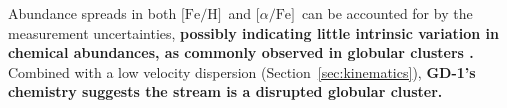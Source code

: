 \documentclass[twocolumn]{aastex63}
\newcommand{\gaia}{\textsl{Gaia}}
\newcommand{\pans}{\textsl{Pan-STARRS}}
\newcommand{\masyr}{\ensuremath{\textrm{mas}\,\textrm{yr}^{-1}}}
\newcommand{\feh}{\ensuremath{\textrm{[Fe/H]}}}
\newcommand{\afe}{\ensuremath{\textrm{[$\alpha$/Fe]}}}
\newcommand{\changes}[1]{{\textbf{#1}}}
\begin{document}
Abundance spreads in both \feh\ and \afe\ can be accounted for by the measurement uncertainties, \changes{possibly indicating little intrinsic variation in chemical abundances, as commonly observed in globular clusters \citep{gratton2019}.}
Combined with a low velocity dispersion (Section~\ref{sec:kinematics}), \changes{GD-1's chemistry suggests the stream is a disrupted globular cluster.}






\end{document}
